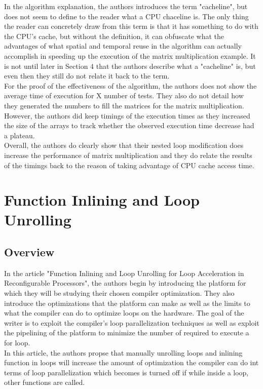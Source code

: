 \documentclass[letterpaper,10pt,titlepage]{article}
\begin{document}
In the algorithm explanation, the authors introduces the term "cacheline", but
does not seem to define to the reader what a CPU chaceline is. The only thing
the reader can concretely draw from this term is that it has something to do
with the CPU's cache, but without the definition, it can obfuscate what the
advantages of what spatial and temporal reuse in the algorithm can actually
accomplish in speeding up the execution of the matrix multiplication example.
It is not until later in Section 4 that the authors describe what a 
"cacheline" is, but even then they still do not relate it back to the term.\\

For the proof of the effectiveness of the algorithm, the authors does not show
the average time of execution for X number of tests. They also do not detail
how they generated the numbers to fill the matrices for the matrix 
multiplication. However, the authors did keep timings of the execution times
as they increased the size of the arrays to track whether the observed 
execution time decrease had a plateau.\\

Overall, the authors do clearly show that their nested loop modification does
increase the performance of matrix multiplication and they do relate the
results of the timings back to the reason of taking advantage of CPU cache 
access time.

\section*{Function Inlining and Loop Unrolling\cite{Miniskar:2012:FIL:2380403.2380426}}
\subsection*{Overview}
In the article "Function Inlining and Loop Unrolling for Loop Acceleration in 
Reconfigurable Processors", the authors begin by introducing the platform for
which they will be studying their chosen compiler optimization. They also 
introduce the optimizations that the platform can make as well as the 
limits to what the compiler can do to optimize loops on the hardware. The goal
 of the writer is to exploit the compiler's loop parallelization techniques 
as well as exploit the pipelining of the platform to minimize the number of 
required to execute a for loop.\\

In this article, the authors propse that manually unrolling loops and inlining
 function in loops will increase the amount of optimization the compiler can 
do int terms of loop parallelization which becomes is turned off if while 
inside a loop, other functions are called.\\
\end{document}
